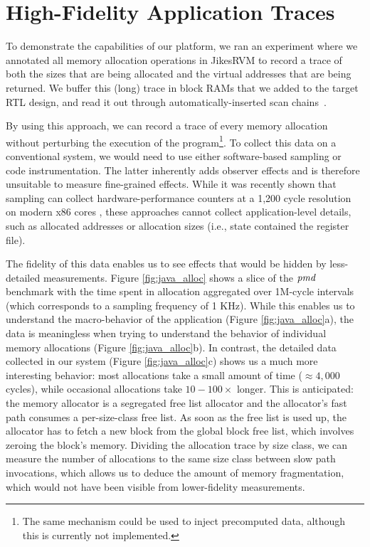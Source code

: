 \section{High-Fidelity Application Traces}

To demonstrate the capabilities of our platform, we ran an experiment where we
annotated all memory allocation operations in JikesRVM to record a trace of
both the sizes that are being allocated and the virtual addresses that are
being returned. We buffer this (long) trace in block RAMs that we added to the
target RTL design, and read it out through automatically-inserted scan
chains~\cite{strober}.

By using this approach, we can record a trace of every memory allocation
without perturbing the execution of the program\footnote{The same mechanism
could be used to inject precomputed data, although this is currently not
implemented.}. To collect this data on a conventional system, we would need to
use either software-based sampling or code instrumentation. The latter
inherently adds observer effects and is therefore unsuitable to measure
fine-grained effects. While it was recently shown that sampling can collect
hardware-performance counters at a 1,200 cycle resolution on modern x86 cores
\cite{Yang:2015:CPM:2749469.2750401}, these approaches cannot collect
application-level details, such as allocated addresses or allocation sizes
(i.e., state contained the register file).

The fidelity of this data enables us to see effects that would be hidden by
less-detailed measurements. Figure \ref{fig:java_alloc} shows a slice of the
$\emph{pmd}$ benchmark with the time spent in allocation aggregated over
1M-cycle intervals (which corresponds to a sampling frequency of 1 KHz). While
this enables us to understand the macro-behavior of the application (Figure
\ref{fig:java_alloc}a), the data is meaningless when trying to understand the
behavior of individual memory allocations (Figure \ref{fig:java_alloc}b). In
contrast, the detailed data collected in our system (Figure
\ref{fig:java_alloc}c) shows us a much more interesting behavior: most
allocations take a small amount of time ($\approx 4,000$ cycles), while
occasional allocations take $10-100\times$ longer. This is anticipated: the
memory allocator is a segregated free list allocator and the allocator's fast
path consumes a per-size-class free list. As soon as the free list is used up,
the allocator has to fetch a new block from the global block free list, which
involves zeroing the block's memory. Dividing the allocation trace by size
class, we can measure the number of allocations to the same size class between
slow path invocations, which allows us to deduce the amount of memory
fragmentation, which would not have been visible from lower-fidelity
measurements.


